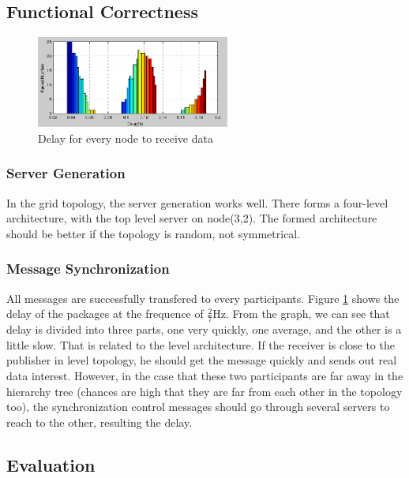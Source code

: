 \documentclass[conference]{IEEEtran}
\begin{document}
\subsection{Functional Correctness}
\begin{figure}[!t]
\centering
\includegraphics[width=2.5in]{../png/function-delay.png}
\caption{Delay for every node to receive data}
\label{function_delay}
\end{figure}
\subsubsection{Server Generation}
In the grid topology, the server generation works well.
There forms a four-level architecture, with the top level server on node(3,2).
The formed architecture should be better if the topology is random, not symmetrical.

\subsubsection{Message Synchronization}
All messages are successfully transfered to every participants.
Figure \ref{function_delay} shows the delay of the packages at the frequence of $\frac{2}{7}$Hz.
From the graph, we can see that delay is divided into three parts,
one very quickly, one average, and the other is a little slow.
That is related to the level architecture.
If the receiver is close to the publisher in level topology,
he should get the message quickly and sends out real data interest.
However, in the case that these two participants are far away in the hierarchy tree
(chances are high that they are far from each other in the topology too),
the synchronization control messages should go through several servers to reach to the other, resulting the delay.

\subsection{Evaluation}
\end{document}
